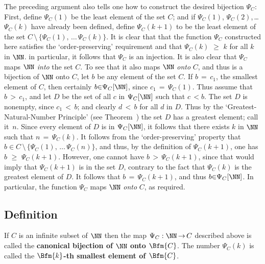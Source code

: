 {     The preceding argument also tells one how to construct the desired bijection ${\Psi}_{C}$:
    First, define ${\Psi}_{C}(1)$ be the least element of the set $C$; and if ${\Psi}_{C}(1)$, ${\Psi}_{C}(2)$,\,{\ldots}\,${\Psi}_{C}(k)$
    have already been defined, define ${\Psi}_{C}(k+1)$ to be the least element of the set $C\,{\setminus}\,\{{\Psi}_{C}(1),\,{\ldots}\,{\Psi}_{C}(k)\}$.
    It is clear that that the function ${\Psi}_{C}$ constructed here satisfies the `order-preserving' requirement and that ${\Psi}_{C}(k)\,\,{\geq}\,\,k$ for all $k$ in ${\NN}$.
    in particular, it follows that ${\Psi}_{C}$ is an injection. It is also clear that ${\Psi}_{C}$ maps ${\NN}$ {\em into} the set $C$.
    To see that it also maps ${\NN}$ {\em onto} $C$, and thus is a bijection of ${\NN}$ onto $C$,
    let $b$ be any element of the set $C$. If $b \,=\, c_{1}$, the smallest element of $C$,
    then certainly $b{\in}{\Psi}_{C}[{\NN}]$, since $c_{1} \,=\, {\Psi}_{C}(1)$.
    Thus assume that $b\,>\,c_{1}$, and let $D$ be the set of all $c$ in ${\Psi}_{C}[{\NN}]$ such that $c\,<b$.
    The set $D$ is nonempty, since $c_{1}\,<\,b$; and clearly $d\,<\,b$ for all $d$ in $D$.
    Thus by the `Greatest-Natural-Number Principle' (see Theorem~) the set $D$ has a greatest element; call it~$n$.
    Since every element of $D$ is in ${\Psi}_{C}[{\NN}]$, it follows that there exists $k$ in ${\NN}$ such that $n \,=\, {\Psi}_{C}(k)$.
    It follows from the `order-preserving' property that $b{\in}C\,{\setminus}\,\{{\Psi}_{C}(1),\,{\ldots}\,{\Psi}_{C}(n)\}$,
    and thus, by the definition of ${\Psi}_{C}(k+1)$, one has $b\,\,{\geq}\,\,{\Psi}_{C}(k+1)$.
    However, one cannot have $b\,>\,{\Psi}_{C}(k+1)$, since that would imply that ${\Psi}_{C}(k+1)$ is in the set $D$,
    contrary to the fact that ${\Psi}_{C}(k)$ is the greatest element of $D$. It follows that $b \,=\, {\Psi}_{C}(k+1)$, and thus $b{\in}{\Psi}_{C}[{\NN}]$.
    In particular, the function ${\Psi}_{C}$ maps ${\NN}$ {\em onto} $C$, as required.
    

\V

        \subsection{\small{{\bf Definition}}}
        \label{DefA30.70}

        If $C$ is an infinite subset of ${\NN}$ then the map ${\Psi}_{C}:{\NN} \,{\rightarrow}\, C$ described above is called the {\bf canonical bijection of ${\NN}$ onto $\Bfm{C}$}.
    The number ${\Psi}_{C}(k)$ is called the {\bf $\Bfm{k}$-th smallest element of $\Bfm{C}$}.

}
